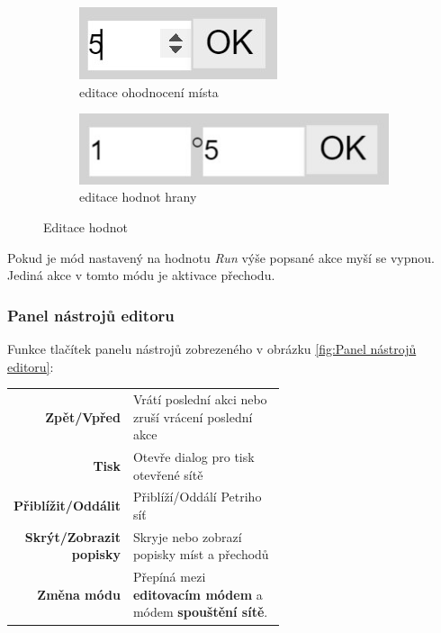 \documentclass[
  biblatex,
  glossaries,
  index
]{kidiplom}
\begin{document}
\begin{figure}[h]
  \centering
  \begin{subfigure}[h]{0,4\linewidth}
    \includegraphics{dialog_place}
    \caption{editace ohodnocení místa}
  \end{subfigure}
  \begin{subfigure}[h]{0,4\linewidth}
    \includegraphics[width=\linewidth]{dialog_arc}
    \caption{editace hodnot hrany}
  \end{subfigure}
  \caption{Editace hodnot}
  \label{fig:editace hodnot}
\end{figure}

Pokud je mód nastavený na hodnotu \textit{Run} výše popsané akce myší 
se vypnou. Jediná akce v tomto módu je aktivace přechodu.

\subsubsection{Panel nástrojů editoru}\label{panel nástrojů}

Funkce tlačítek panelu nástrojů zobrezeného v obrázku \ref{fig:Panel nástrojů editoru}:
\begin{center}
  \begin{tabular}{r p{0.6\linewidth}}
    \textbf{Zpět/Vpřed}          & Vrátí poslední akci nebo zruší vrácení poslední akce \\
    \textbf{Tisk}                & Otevře dialog pro tisk otevřené sítě \\
    \textbf{Přiblížit/Oddálit}   & Přiblíží/Oddálí Petriho síť \\
    \textbf{Skrýt/Zobrazit popisky}  & Skryje nebo zobrazí popisky míst a přechodů \\
    \textbf{Změna módu}  & Přepíná mezi \textbf{editovacím módem} a módem \textbf{spouštění sítě}. \\
  \end{tabular}
\end{center}
\end{document}
